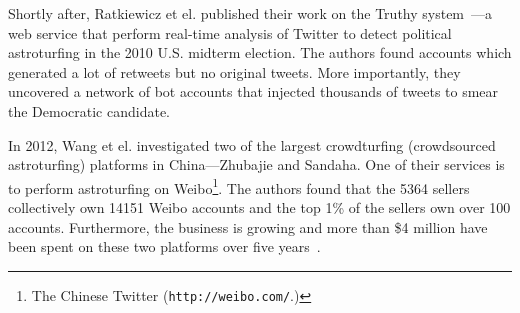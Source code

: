 \begin{comment}
In the 2010 Massachusetts senate race, Mustafaraj and Metaxas found evidence
that Republican campaigners created fake Twitter accounts and used them to send
spam. The spam caused Google real-time search results to tip in their favour
thus causing a spread of misinformation~\cite{mustafaraj2010obscurity}.
Ratkiewicz et el. suggest that this type of attack can be mounted cheaply and
may have a larger influence than traditional
advertising~\cite{ratkiewicz2011truthy}.
\end{comment}

Shortly after, Ratkiewicz et el. published their work on the Truthy
system~\cite{ratkiewicz2011truthy}---a web service that perform real-time
analysis of Twitter to detect political astroturfing in the 2010 U.S. midterm
election. The authors found accounts which generated a lot of retweets but no
original tweets. More importantly, they uncovered a network of bot accounts that
injected thousands of tweets to smear the Democratic candidate.

In 2012, Wang et el. investigated two of the largest crowdturfing (crowdsourced
astroturfing) platforms in China---Zhubajie and Sandaha. One of their services
is to perform astroturfing on Weibo\footnote{The Chinese Twitter
  (\texttt{http://weibo.com/}.)}. The authors found that the 5364 sellers
collectively own 14151 Weibo accounts and the top 1\% of the sellers own over
100 accounts. Furthermore, the business is growing and more than \$4 million
have been spent on these two platforms over five years~\cite{wang2012serf}.

